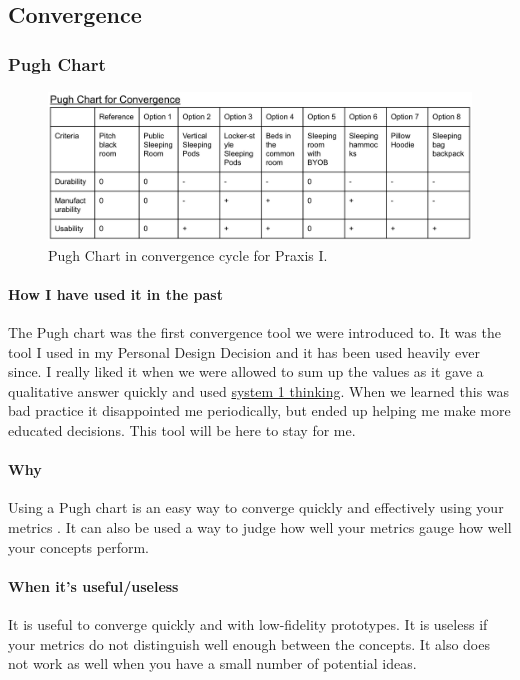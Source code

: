 \documentclass[paper=a4, fontsize=11pt]{article} %
\newcommand{\raisetarget}[2]%
{\bgroup
  \sbox0{#2}%
  \raisebox{\ht0}{\hypertarget{#1}{}}\usebox0%
\egroup}
\begin{document}
    \subsection{Convergence}
        \raisetarget{pughlink}{}
        \subsubsection{Pugh Chart}
            \begin{figure}[H]
                \centering
	            \includegraphics[width=1\linewidth]{firstpugh.png}
	            \caption{Pugh Chart in convergence cycle for Praxis I.}
            \end{figure}
            \paragraph{How I have used it in the past}
            \cite{pugh} The Pugh chart was the first convergence tool we were introduced to. It was the tool I used in my Personal Design Decision and it has been used heavily ever since. I really liked it when we were allowed to sum up the values as it gave a qualitative answer quickly and used \hyperlink{sys1v2}{system 1 thinking}. When we learned this was bad practice it disappointed me periodically, but ended up helping me make more educated decisions. This tool will be here to stay for me. 
            \paragraph{Why} Using a Pugh chart is an easy way to converge quickly and effectively using your metrics \cite{metrics}. It can also be used a way to judge how well your metrics \cite{metrics} gauge how well your concepts perform. 
            \paragraph{When it's useful/useless} It is useful to converge quickly and with low-fidelity prototypes. It is useless if your metrics \cite{metrics} do not distinguish well enough between the concepts. It also does not work as well when you have a small number of potential ideas. 
\end{document}
